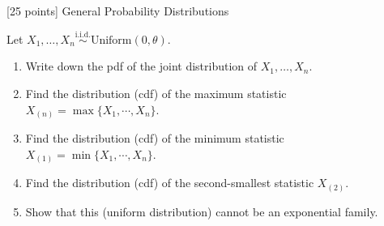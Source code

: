 [25 points] General Probability Distributions
 
Let $X_1,\ldots,X_n \overset{\text{i.i.d.}}{\sim}{\text{Uniform}}(0,\theta)$.  
\begin{enumerate}
    \item Write down the pdf of the joint distribution of $X_1,\ldots,X_n$.
    \item Find the distribution (cdf) of the maximum statistic $X_{(n)} = \operatorname{max}
    \{X_1,\cdots,X_n\}$.
    \item Find the distribution (cdf) of the minimum statistic $X_{(1)} = \operatorname{min}
    \{X_1,\cdots,X_n\}$.
    \item Find the distribution (cdf) of the second-smallest statistic $X_{(2)}$.  
    \item Show that this (uniform distribution) cannot be an exponential family.
\end{enumerate}


